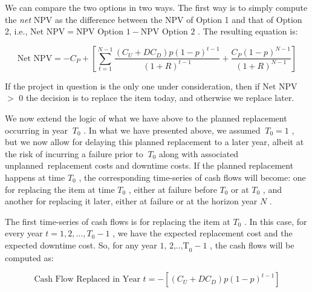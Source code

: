 We can compare the two options in two ways. The first way is to simply compute the {\it net}  NPV as the difference between the NPV of Option 1 and that of Option 2, i.e.,  \( \mbox{Net NPV}=\mbox{NPV Option }1-\mbox{NPV Option }2 \) . The resulting equation is:\par




\begin{equation}\label{npv_7}
\mbox{Net NPV}= -C_{P}+ \left[  \sum _{t=1}^{N-1}\frac{ \left( C_{U}+DC_{D} \right) p \left( 1-p \right) ^{t-1}}{ \left( 1+R \right) ^{t-1}}+\frac{C_{P} \left( 1-p \right) ^{N-1}}{ \left( 1+R \right) ^{N-1}} \right]
\end{equation}


If the project in question is the only one under consideration, then if  \( \text{Net NPV} \)  $>$ 0 the decision is to replace the item today, and otherwise we replace later.

We now extend the logic of what we have above to the planned replacement occurring in year \( ~T_{0} \) . In what we have presented above, we assumed  \( ~T_{0}=1 \) , but we now allow for delaying this planned replacement to a later year, albeit at the risk of incurring a failure prior to  \( ~T_{0} \)  along with associated unplanned\ replacement costs and downtime costs.  If the planned replacement happens at time  \( T_{0} \) , the corresponding time-series of cash flows will become: one for replacing the item at time  \( T_{0} \) , either at failure before  \( T_{0} \)  or at  \( T_{0} \) , and another for replacing it later, either at failure or at the horizon year  \( N \) .\par

The first time-series of cash flows is for replacing the item at  \( T_{0} \) . In this case, for every year  \( t=1, 2, \ldots ,T_{0}-1 \) , we have the expected replacement cost and the expected downtime cost. So, for any year  \( \text{1, 2,..,T}_{0}-1 \) , the cash flows will be computed as:\par




\begin{equation}\label{npv_8}
\mbox{Cash Flow Replaced in Year }t= - \left[  \left( C_{U}+DC_{D} \right)  p \left( 1-p \right) ^{t-1} \right]
\end{equation}


